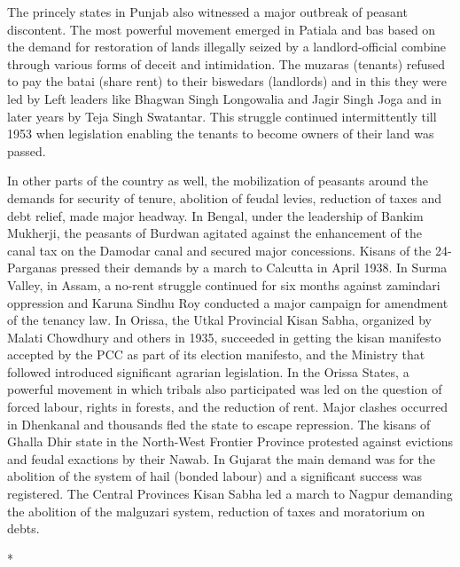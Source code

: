 The princely states in Punjab also witnessed a major outbreak of peasant discontent. The most powerful movement emerged in Patiala and bas based on the demand for restoration of lands illegally seized by a landlord-official combine through various forms of deceit and intimidation. The muzaras (tenants) refused to pay the batai (share rent) to their biswedars (landlords) and in this they were led by Left leaders like Bhagwan Singh Longowalia and Jagir Singh Joga and in later years by Teja Singh Swatantar. This struggle continued intermittently till 1953 when legislation enabling the tenants to become owners of their land was passed.

In other parts of the country as well, the mobilization of peasants around the demands for security of tenure, abolition of feudal levies, reduction of taxes and debt relief, made major headway. In Bengal, under the leadership of Bankim Mukherji, the peasants of Burdwan agitated against the enhancement of the canal tax on the Damodar canal and secured major concessions. Kisans of the 24-Parganas pressed their demands by a march to Calcutta in April 1938. In Surma Valley, in Assam, a no-rent struggle continued for six months against zamindari oppression and Karuna Sindhu Roy conducted a major campaign for amendment of the tenancy law. In Orissa, the Utkal Provincial Kisan Sabha, organized by Malati Chowdhury and others in 1935, succeeded in getting the kisan manifesto accepted by the PCC as part of its election manifesto, and the Ministry that followed introduced significant agrarian legislation. In the Orissa States, a powerful movement in which tribals also participated was led on the question of forced labour, rights in forests, and the reduction of rent. Major clashes occurred in Dhenkanal and thousands fled the state to escape repression. The kisans of Ghalla Dhir state in the North-West Frontier Province protested against evictions and feudal exactions by their Nawab. In Gujarat the main demand was for the abolition of the system of hail (bonded labour) and a significant success was registered. The Central Provinces Kisan Sabha led a march to Nagpur demanding the abolition of the malguzari system, reduction of taxes and moratorium on debts.

\begin{center}*\end{center}

\paragraph*{}

